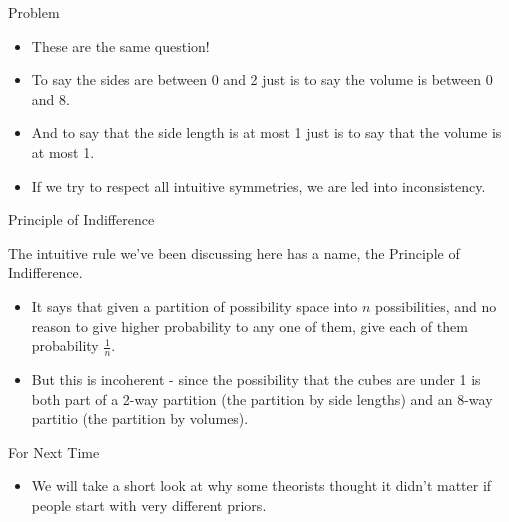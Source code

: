 \documentclass[
  ignorenonframetext,
]{beamer}
\providecommand{\tightlist}{%
  \setlength{\itemsep}{0pt}\setlength{\parskip}{0pt}}
\renewcommand{\,}{\text{, }}
\begin{document}
\begin{frame}{Problem}
\protect\hypertarget{problem}{}

\begin{itemize}
\tightlist
\item
  These are the same question!
\item
  To say the sides are between 0 and 2 just is to say the volume is
  between 0 and 8.
\item
  And to say that the side length is at most 1 just is to say that the
  volume is at most 1.
\item
  If we try to respect all intuitive symmetries, we are led into
  inconsistency.
\end{itemize}

\end{frame}

\begin{frame}{Principle of Indifference}
\protect\hypertarget{principle-of-indifference}{}

The intuitive rule we've been discussing here has a name, the Principle
of Indifference.

\begin{itemize}
\tightlist
\item
  It says that given a partition of possibility space into \(n\)
  possibilities, and no reason to give higher probability to any one of
  them, give each of them probability \(\frac{1}{n}\).
\item
  But this is incoherent - since the possibility that the cubes are
  under 1 is both part of a 2-way partition (the partition by side
  lengths) and an 8-way partitio (the partition by volumes).
\end{itemize}

\end{frame}

\begin{frame}{For Next Time}
\protect\hypertarget{for-next-time}{}

\begin{itemize}
\tightlist
\item
  We will take a short look at why some theorists thought it didn't
  matter if people start with very different priors.
\end{itemize}

\end{frame}
\end{document}
